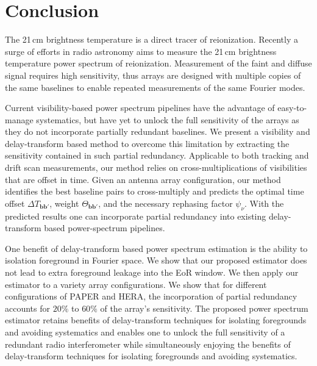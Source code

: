 \documentclass[twocolumn,apj,numberedappendix]{emulateapj}
\renewcommand\[{\begin{equation}}
\renewcommand\]{\end{equation}}
\begin{document}
\section{Conclusion}
The 21\,cm brightness temperature is a direct tracer of reionization. Recently a surge of efforts in radio astronomy aims to measure the 21\,cm brightness temperature power spectrum of reionization. Measurement of the faint and diffuse signal requires high sensitivity, thus arrays are designed with multiple copies of the same baselines to enable repeated measurements of the same Fourier modes. 
 
Current visibility-based power spectrum pipelines have the advantage of easy-to-manage systematics, but have yet to unlock the full sensitivity of the arrays as they do not incorporate partially redundant baselines.  We present a visibility and delay-transform based method to overcome this limitation by extracting the sensitivity contained in such partial redundancy. Applicable to both tracking and drift scan measurements, our method relies on cross-multiplications of visibilities that are offset in time. Given an antenna array configuration, our method identifies the best baseline pairs to cross-multiply and predicts the optimal time offset $\Delta T_{\boldsymbol{bb'}}$, weight $\Theta_{\boldsymbol{bb'}}$, and the necessary rephasing factor $\psi_\nu$. With the predicted results one can incorporate partial redundancy into existing delay-transform based power-spectrum pipelines. 

One benefit of delay-transform based power spectrum estimation is the ability to isolation foreground in Fourier space. We show that our proposed estimator does not lead to extra foreground leakage into the EoR window. We then apply our estimator to a variety array configurations. We show that for different configurations of PAPER and HERA, the incorporation of partial redundancy accounts for $20\%$ to $60\%$ of the array's sensitivity. The proposed power spectrum estimator retains benefits of delay-transform techniques for isolating foregrounds and avoiding systematics and enables one to unlock the full sensitivity of a redundant radio interferometer while simultaneously enjoying the benefits of delay-transform techniques for isolating foregrounds and avoiding systematics. 


\pagebreak



\appendix
\end{document}
